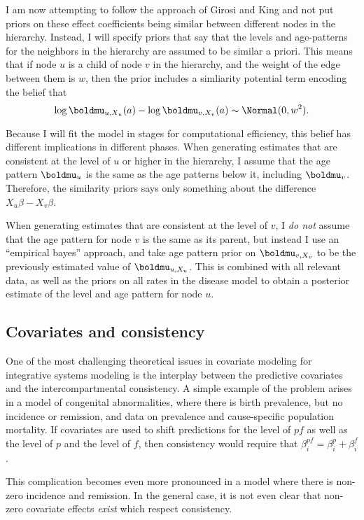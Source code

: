 I am now attempting to follow the approach of Girosi and King and not
put priors on these effect coefficients being similar between
different nodes in the hierarchy.  Instead, I will specify priors that
say that the levels and age-patterns for the neighbors in the
hierarchy are assumed to be similar a priori.  This means that if node
$u$ is a child of node $v$ in the hierarchy, and the weight of the
edge between them is $w$, then the prior includes a simliarity
potential term encoding the belief that
\[
\log \boldmu_{u,X_u}(a) - \log \boldmu_{v,X_v}(a) \sim \Normal(0, w^2).
\]

Because I will fit the model in stages for computational efficiency,
this belief has different implications in different phases.  When
generating estimates that are consistent at the level of $u$ or higher
in the hierarchy, I assume that the age pattern $\boldmu_u$ is the
same as the age patterns below it, including $\boldmu_v$.  Therefore,
the similarity priors says only something about the difference
$X_u\beta - X_v\beta$.

When generating estimates that are consistent at the level of $v$, I
\emph{do not} assume that the age pattern for node $v$ is the same as
its parent, but instead I use an ``empirical bayes'' approach, and
take age pattern prior on $\boldmu_{v,X_v}$ to be the previously
estimated value of $\boldmu_{u,X_u}$.  This is combined with all
relevant data, as well as the priors on all rates in the disease model
to obtain a posterior estimate of the level and age pattern for node
$u$.

\subsection{Covariates and consistency}
One of the most challenging theoretical issues in covariate modeling
for integrative systems modeling is the interplay between the
predictive covariates and the intercompartmental consistency.  A
simple example of the problem arises in a model of congenital
abnormalities, where there is birth prevalence, but no incidence or
remission, and data on prevalence and cause-specific population
mortality. If covariates are used to shift predictions for the level
of $pf$ as well as the level of $p$ and the level of $f$, then
consistency would require that $\beta^{pf}_i = \beta^p_i + \beta^f_i$.

This complication becomes even more pronounced in a model where there
is non-zero incidence and remission.  In the general case, it is not
even clear that non-zero covariate effects \emph{exist} which respect
consistency.

